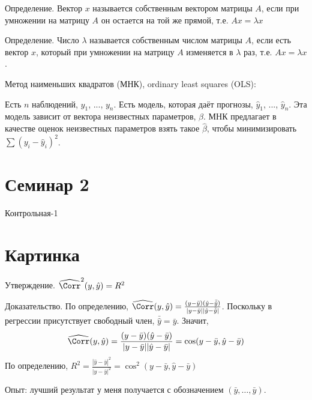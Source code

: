 \documentclass[pdftex,12pt,a4paper]{article}
\def \hb{\hat{\beta}}
\def \hy{\hat{y}}
\def \hCorr{\widehat{\Corr}}
\begin{document}
Определение. Вектор $x$ называется собственным вектором матрицы $A$, если при умножении на матрицу $A$ он остается на той же прямой, т.е. $Ax=\lambda x$


Определение. Число $\lambda$ называется собственным числом матрицы $A$, если есть вектор $x$, который при умножении на матрицу $A$ изменяется в $\lambda$ раз, т.е. $Ax=\lambda x$.




Метод наименьших квадратов (МНК), ordinary least squares (OLS):


Есть $n$ наблюдений, $y_1$, ..., $y_n$. Есть модель, которая даёт прогнозы, $\hat{y}_1$, ..., $\hat{y}_n$. Эта модель зависит от вектора неизвестных параметров, $\beta$. МНК предлагает в качестве оценок неизвестных параметров взять такое $\hb$, чтобы минимизировать $\sum (y_i-\hat{y}_i)^2$.

\section{Семинар 2}

Контрольная-1

\section{Картинка}


Утверждение. $\hCorr^2(y,\hy)=R^2$

Доказательство. По определению, $\hCorr(y,\hy)=\frac{(y-\bar{y})(\hy-\bar{\hy})}{|y-\bar{y}||\hy-\bar{\hy}|}$. Поскольку в регрессии присутствует свободный член, $\bar{\hy}=\bar{y}$. Значит, 
\begin{equation}
\hCorr(y,\hy)=\frac{(y-\bar{y})(\hy-\bar{y})}{|y-\bar{y}||\hy-\bar{y}|}=\cos(y-\bar{y},\hy-\bar{y})
\end{equation}
По определению, $R^2=\frac{|\hy-\bar{y}|^2}{|y-\bar{y}|^2}=\cos^2(y-\bar{y},\hy-\bar{y})$



Опыт: лучший результат у меня получается с обозначением $(\bar{y},\ldots,\bar{y})$.
\end{document}

